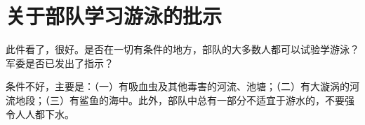 \section[关于部队学习游泳的批示（一九六四年八月六日）]{关于部队学习游泳的批示}


此件看了，很好。是否在一切有条件的地方，部队的大多数人都可以试验学游泳？军委是否已发出了指示？

条件不好，主要是：（一）有吸血虫及其他毒害的河流、池塘；（二）有大漩涡的河流地段；（三）有鲨鱼的海中。此外，部队中总有一部分不适宜于游水的，不要强令人人都下水。

